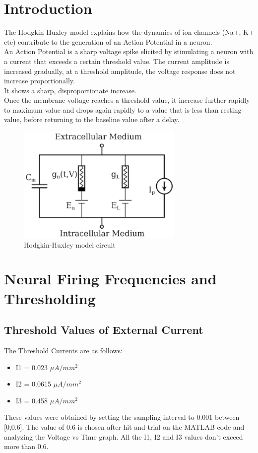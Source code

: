 \documentclass{article}
\begin{document}
\section{Introduction}
The Hodgkin-Huxley model explains how the dynamics of ion channels (Na+, K+ etc) contribute to the generation of an Action Potential in a neuron.\\
An Action Potential is a sharp voltage spike elicited by stimulating a neuron with a current that exceeds a certain threshold value. The current amplitude is increased gradually, at a threshold amplitude, the voltage response does not increase proportionally. \\
It shows a sharp, disproportionate increase.\\ Once the membrane voltage reaches a threshold value, it increase further rapidly to maximum value and drops again rapidly to a value that is less than resting value, before returning to the baseline value after a delay.
\begin{figure}[h]
\includegraphics[width=8cm]{hh.png}
\caption{Hodgkin-Huxley model circuit}
\end{figure}
\section{Neural Firing Frequencies and Thresholding}
\subsection{Threshold Values of External Current}
The Threshold Currents are as follows:
\begin{itemize}
    \item I1 = 0.023 $\mu A/ mm^2$
    \vspace{-3mm}
    \item I2 = 0.0615 $\mu A/ mm^2$
    \vspace{-3mm}
    \item I3 = 0.458 $\mu A/ mm^2$
\end{itemize}
These values were obtained by setting the sampling interval to 0.001 between [0,0.6]. The value of 0.6 is chosen after hit and trial on the MATLAB code and analyzing the Voltage vs Time graph. All the I1, I2 and I3 values don't exceed more than 0.6.
\end{document}
